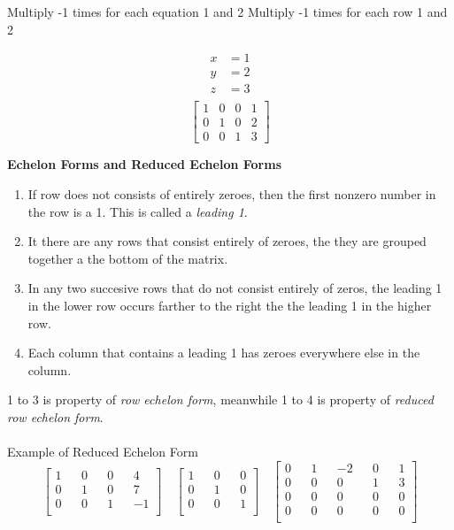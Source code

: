 \documentclass[a4paper, 12pt]{article}
\begin{document}
\begin{multicols}{2} 
Multiply -1 times for each equation 1 and 2
\break
Multiply -1 times for each row 1 and 2
\end{multicols}


\begin{multicols}{2}
\begin{align*}
x &= 1 \\
y &= 2 \\
z  &= 3\\
\end{align*}
\break
\[ \left[ {\begin{array}{cccc}
1 & 0 & 0  & 1 \\
0 & 1 & 0 & 2 \\
0 & 0 & 1  & 3 
\end{array}} \right] \]
\end{multicols} 

\textbf{Echelon Forms and Reduced Echelon Forms}
\begin{enumerate}
\item If row does not consists of entirely zeroes, then the first nonzero 
      number in the row is a 1. This is called a \textit{leading 1}.
\item It there are any rows that consist entirely of zeroes, the they are 
      grouped together a the bottom of the matrix.
\item In any two succesive rows that do not consist entirely of zeros, the 
      leading 1 in the lower row occurs farther to the right the the 
      leading 1 in the higher row.
\item Each column that contains a leading 1 has zeroes everywhere else in
      the column.
\end{enumerate}
1 to 3 is property of  \textit{row echelon form}, meanwhile 1 to 4 is 
property of \textit{reduced row echelon form}.
\\
\\
Example of Reduced Echelon Form
$$
\begin{bmatrix}
1 && 0 && 0 && 4 \\
0 && 1 && 0 && 7 \\
0 && 0 && 1 && -1 \\
\end{bmatrix}
\quad
\begin{bmatrix}
1 && 0 && 0 \\
0 && 1 && 0 \\
0 && 0 && 1 \\
\end{bmatrix}
\quad
\begin{bmatrix}
0 && 1 && -2 && 0 && 1 \\
0 && 0 && 0 && 1 && 3  \\
0 && 0 && 0 && 0 && 0  \\
0 && 0 && 0 && 0 && 0  \\
\end{bmatrix}
$$
\end{document}
